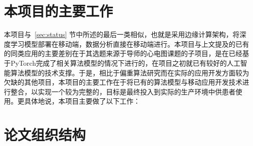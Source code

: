 \section{本项目的主要工作}\label{sec:work}

本项目与~\ref{sec:status} 节中所述的最后一类相似，也就是采用边缘计算架构，将深度学习模型部署在移动端，数据分析直接在移动端进行。本项目与上文提及的已有的同类应用的主要差别在于其选题来源于导师的心电图课题的子项目，是在已经基于PyTorch完成了相关算法模型\cite{songDongtaixindiantudezhinengjiancesuanfayanjiuyuyingyong2022}的情况下进行的，在项目之初就已有较好的人工智能算法模型的技术支撑。于是，相比于偏重算法研究而在实际的应用开发方面较为欠缺的其他项目，本项目的主要工作在于将已有的算法模型与移动应用开发技术进行整合，以实现一个较为完整的\app ，目标是最终投入到实际的生产环境中供患者使用。更具体地说，本项目主要做了以下工作：



\section{论文组织结构}\label{sec:structure}

